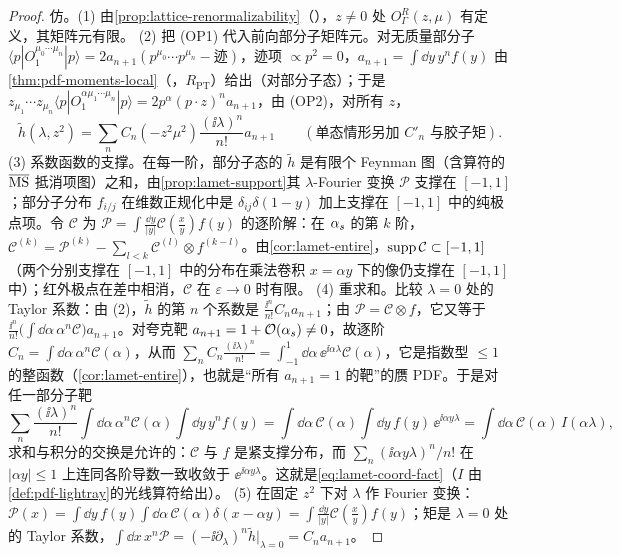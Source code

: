 \begin{proof}
仿\cite[第~II--III~节]{IzubuchiEtAl2018}。(1) 由\cref{prop:lattice-renormalizability}（\tagA），$z\neq0$ 处 $O^R_\Gamma(z,\mu)$ 有定义，其矩阵元有限。
(2) 把 (OP1) 代入前向部分子矩阵元。对无质量部分子 $\langle p|O_1^{\mu_0\cdots\mu_n}|p\rangle=2a_{n+1}(p^{\mu_0}\cdots p^{\mu_n}-\text{迹})$，迹项 $\propto p^2=0$，$a_{n+1}=\int\dd y\,y^nf(y)$ 由\cref{thm:pdf-moments-local}（\tagR，$R_{\mathrm{PT}}$）给出（对部分子态）；于是 $z_{\mu_1}\cdots z_{\mu_n}\langle p|O_1^{\alpha\mu_1\cdots\mu_n}|p\rangle=2p^\alpha(p\cdot z)^na_{n+1}$，由 (OP2)，对所有 $z$，
\[
\tilde h(\lambda,z^2)=\sum_nC_n(-z^2\mu^2)\frac{(\ii\lambda)^n}{n!}a_{n+1}\qquad(\text{单态情形另加 }C'_n\text{ 与胶子矩}).
\]
(3) 系数函数的支撑。在每一阶，部分子态的 $\tilde h$ 是有限个 Feynman 图（含算符的 $\overline{\mathrm{MS}}$ 抵消项图）之和，由\cref{prop:lamet-support}其 $\lambda$-Fourier 变换 $\mathcal P$ 支撑在 $[-1,1]$；部分子分布 $f_{i/j}$ 在维数正规化中是 $\delta_{ij}\delta(1-y)$ 加上支撑在 $[-1,1]$ 中的纯极点项。令 $\mathcal C$ 为 $\mathcal P=\int\frac{\dd y}{|y|}\mathcal C(\frac xy)f(y)$ 的逐阶解：在 $\alpha_s$ 的第 $k$ 阶，$\mathcal C^{(k)}=\mathcal P^{(k)}-\sum_{l<k}\mathcal C^{(l)}\otimes f^{(k-l)}$。由\cref{cor:lamet-entire}，${\rm supp}\,\mathcal C\subset[-1,1]$（两个分别支撑在 $[-1,1]$ 中的分布在乘法卷积 $x=\alpha y$ 下的像仍支撑在 $[-1,1]$ 中）；红外极点在差中相消，$\mathcal C$ 在 $\varepsilon\to0$ 时有限。
(4) 重求和。比较 $\lambda=0$ 处的 Taylor 系数：由 (2)，$\tilde h$ 的第 $n$ 个系数是 $\frac{\ii^n}{n!}C_na_{n+1}$；由 $\mathcal P=\mathcal C\otimes f$，它又等于 $\frac{\ii^n}{n!}\big(\int\dd\alpha\,\alpha^n\mathcal C\big)a_{n+1}$。对夸克靶 $a_{n+1}=1+\mathcal{O}\!\left(\alpha_s\right)\neq0$，故逐阶 $C_n=\int\dd\alpha\,\alpha^n\mathcal C(\alpha)$，从而 $\sum_nC_n\frac{(\ii\lambda)^n}{n!}=\int_{-1}^1\dd\alpha\,\ee^{\ii\alpha\lambda}\mathcal C(\alpha)$，它是指数型 $\le1$ 的整函数（\cref{cor:lamet-entire}），也就是“所有 $a_{n+1}=1$ 的靶”的赝 PDF。于是对任一部分子靶
\[
\sum_n\frac{(\ii\lambda)^n}{n!}\int\dd\alpha\,\alpha^n\mathcal C(\alpha)\int\dd y\,y^nf(y)=\int\dd\alpha\,\mathcal C(\alpha)\int\dd y\,f(y)\,\ee^{\ii\alpha y\lambda}=\int\dd\alpha\,\mathcal C(\alpha)\,I(\alpha\lambda),
\]
求和与积分的交换是允许的：$\mathcal C$ 与 $f$ 是紧支撑分布，而 $\sum_n(\ii\alpha y\lambda)^n/n!$ 在 $|\alpha y|\le1$ 上连同各阶导数一致收敛于 $\ee^{\ii\alpha y\lambda}$。这就是\cref{eq:lamet-coord-fact}（$I$ 由\cref{def:pdf-lightray}的光线算符给出）。
(5) 在固定 $z^2$ 下对 $\lambda$ 作 Fourier 变换：$\mathcal P(x)=\int\dd y\,f(y)\int\dd\alpha\,\mathcal C(\alpha)\delta(x-\alpha y)=\int\frac{\dd y}{|y|}\mathcal C(\frac xy)f(y)$；矩是 $\lambda=0$ 处的 Taylor 系数，$\int\dd x\,x^n\mathcal P=(-\ii\partial_\lambda)^n\tilde h|_{\lambda=0}=C_na_{n+1}$。
\end{proof}


